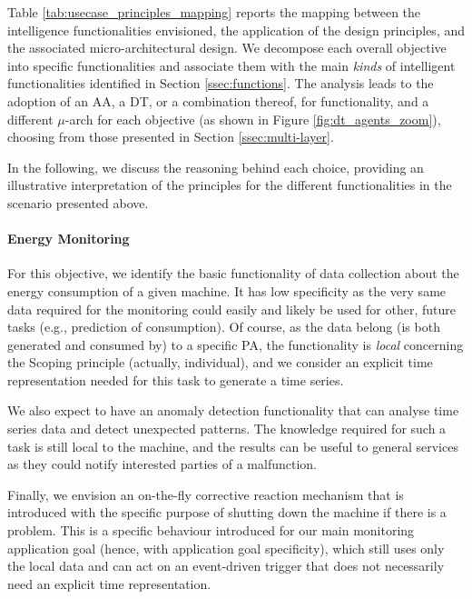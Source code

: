 Table \ref{tab:usecase_principles_mapping} reports the mapping between the intelligence functionalities envisioned, the application of the design principles, and the associated micro-architectural design. %
%
We decompose each overall objective into specific functionalities and associate them with the main \textit{ kinds} of intelligent functionalities identified in Section \ref{ssec:functions}.
%
The analysis leads to the adoption of an AA, a DT, or a combination thereof, for functionality, and a different $\mu$-arch for each objective (as shown in Figure \ref{fig:dt_agents_zoom}), choosing from those presented in Section \ref{ssec:multi-layer}.

In the following, we discuss the reasoning behind each choice, providing an illustrative interpretation of the principles for the different functionalities in the scenario presented above. 

\paragraph{Energy Monitoring}

For this objective, we identify the basic functionality of data collection about the energy consumption of a given machine. 
It has low specificity as the very same data required for the monitoring could easily and likely be used for other, future tasks (e.g., prediction of consumption). 
%
Of course, as the data belong (is both generated and consumed by) to a specific PA, the functionality is \textit{local} concerning the Scoping principle (actually, individual), 
%
and we consider an explicit time representation needed for this task to generate a time series. 

We also expect to have an anomaly detection functionality that can analyse time series data and detect unexpected patterns. 
The knowledge required for such a task is still local to the machine, and the results can be useful to general services as they could notify interested parties of a malfunction. 

Finally, we envision an on-the-fly corrective reaction mechanism that is introduced with the specific purpose of shutting down the machine if there is a problem. 
This is a specific behaviour introduced for our main monitoring application goal (hence, with application goal specificity), which still uses only the local data and can act on an event-driven trigger that does not necessarily need an explicit time representation. 

